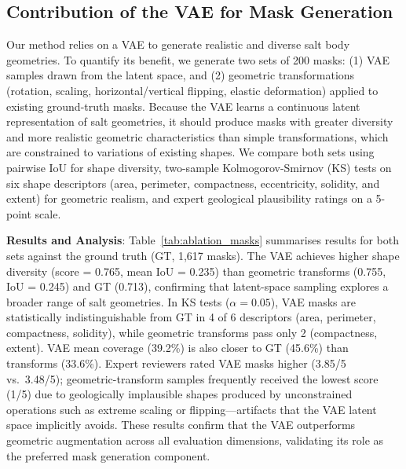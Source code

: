 \documentclass{ieeeaccess}
\begin{document}
\subsection{Contribution of the VAE for Mask Generation}

Our method relies on a VAE to generate realistic and diverse salt body geometries. To quantify its benefit, we generate two sets of 200 masks: (1) VAE samples drawn from the latent space, and (2) geometric transformations (rotation, scaling, horizontal/vertical flipping, elastic deformation) applied to existing ground-truth masks. Because the VAE learns a continuous latent representation of salt geometries, it should produce masks with greater diversity and more realistic geometric characteristics than simple transformations, which are constrained to variations of existing shapes. We compare both sets using pairwise IoU for shape diversity, two-sample Kolmogorov-Smirnov (KS) tests on six shape descriptors (area, perimeter, compactness, eccentricity, solidity, and extent) for geometric realism, and expert geological plausibility ratings on a 5-point scale.

\textbf{Results and Analysis}: Table~\ref{tab:ablation_masks} summarises results for both sets against the ground truth (GT, 1,617 masks). The VAE achieves higher shape diversity (score = 0.765, mean IoU = 0.235) than geometric transforms (0.755, IoU = 0.245) and GT (0.713), confirming that latent-space sampling explores a broader range of salt geometries. In KS tests ($\alpha = 0.05$), VAE masks are statistically indistinguishable from GT in 4 of 6 descriptors (area, perimeter, compactness, solidity), while geometric transforms pass only 2 (compactness, extent). VAE mean coverage (39.2\%) is also closer to GT (45.6\%) than transforms (33.6\%). Expert reviewers rated VAE masks higher (3.85/5 vs.\ 3.48/5); geometric-transform samples frequently received the lowest score (1/5) due to geologically implausible shapes produced by unconstrained operations such as extreme scaling or flipping---artifacts that the VAE latent space implicitly avoids. These results confirm that the VAE outperforms geometric augmentation across all evaluation dimensions, validating its role as the preferred mask generation component.
\end{document}
